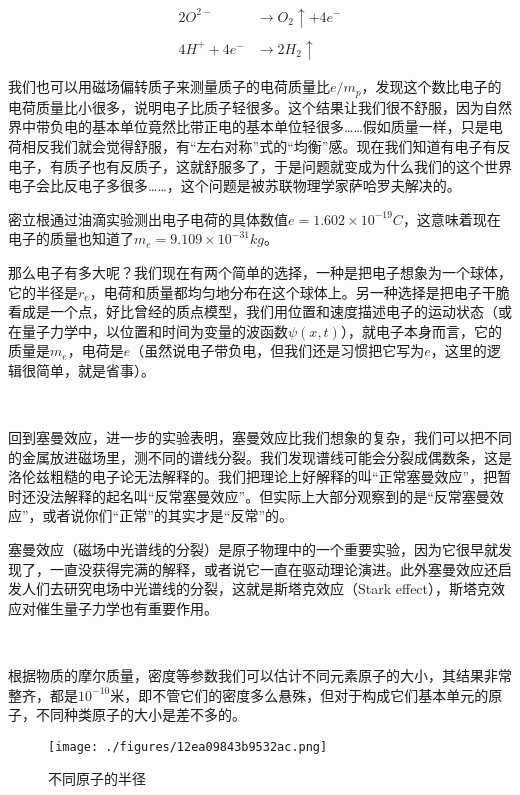\begin{align}
2O^{2-} & \rightarrow O_2 \uparrow + 4e^- \\\\
4H^+ + 4e^- & \rightarrow 2H_2 \uparrow~
\end{align}


我们也可以用磁场偏转质子来测量质子的电荷质量比$e/m_p$，发现这个数比电子的电荷质量比小很多，说明电子比质子轻很多。这个结果让我们很不舒服，因为自然界中带负电的基本单位竟然比带正电的基本单位轻很多……假如质量一样，只是电荷相反我们就会觉得舒服，有“左右对称”式的“均衡”感。现在我们知道有电子有反电子，有质子也有反质子，这就舒服多了，于是问题就变成为什么我们的这个世界电子会比反电子多很多……，这个问题是被苏联物理学家萨哈罗夫解决的。

密立根通过油滴实验测出电子电荷的具体数值$e = 1.602 \times 10^{-19} C$，这意味着现在电子的质量也知道了$m_e = 9.109 \times 10^{-31} kg$。

那么电子有多大呢？我们现在有两个简单的选择，一种是把电子想象为一个球体，它的半径是$r_e$，电荷和质量都均匀地分布在这个球体上。另一种选择是把电子干脆看成是一个点，好比曾经的质点模型，我们用位置和速度描述电子的运动状态（或在量子力学中，以位置和时间为变量的波函数$\psi(x,t)$），就电子本身而言，它的质量是$m_e$，电荷是$e$（虽然说电子带负电，但我们还是习惯把它写为$e$，这里的逻辑很简单，就是省事）。

~

回到塞曼效应，进一步的实验表明，塞曼效应比我们想象的复杂，我们可以把不同的金属放进磁场里，测不同的谱线分裂。我们发现谱线可能会分裂成偶数条，这是洛伦兹粗糙的电子论无法解释的。我们把理论上好解释的叫“正常塞曼效应”，把暂时还没法解释的起名叫“反常塞曼效应”。但实际上大部分观察到的是“反常塞曼效应”，或者说你们“正常”的其实才是“反常”的。

塞曼效应（磁场中光谱线的分裂）是原子物理中的一个重要实验，因为它很早就发现了，一直没获得完满的解释，或者说它一直在驱动理论演进。此外塞曼效应还启发人们去研究电场中光谱线的分裂，这就是斯塔克效应（Stark effect），斯塔克效应对催生量子力学也有重要作用。

~

根据物质的摩尔质量，密度等参数我们可以估计不同元素原子的大小，其结果非常整齐，都是$10^{-10}$米，即不管它们的密度多么悬殊，但对于构成它们基本单元的原子，不同种类原子的大小是差不多的。

\begin{figure}[ht]
\centering
\texttt{[image: ./figures/12ea09843b9532ac.png]}
\caption{不同原子的半径} \label{fig_QMPre2_10}
\end{figure}


